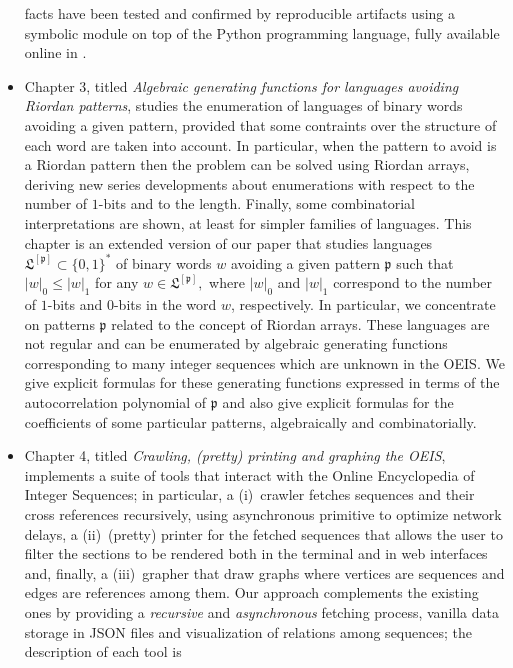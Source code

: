 \documentclass[a4paper, 10pt]{article}
\begin{document}
\begin{itemize}
facts have been tested and confirmed by reproducible artifacts using a symbolic
module on top of the Python programming language, fully available online in
\citep{MN:simulation:method:repo}.
\item Chapter 3, titled \textit{Algebraic generating functions for
languages avoiding Riordan patterns},
studies the enumeration of languages of binary words avoiding a given pattern,
provided that some contraints over the structure of each word are taken into
account.  In particular, when the pattern to avoid is a Riordan pattern then
the problem can be solved using Riordan arrays, deriving new series
developments about enumerations with respect to the number of $1$-bits and to
the length. Finally, some combinatorial interpretations are shown, at least for
simpler families of languages.  This chapter is an extended version of our paper
\citep{Merlini:Nocentini:algebraic:gf:avoiding:patterns} that studies languages
$\mathfrak{L}^{[\mathfrak{p}]}\subset \{0,1\}^*$ of binary words $w$ avoiding a
given pattern $\mathfrak{p}$ such that $|w|_0\leq |w|_1$ for any $w\in
\mathfrak{L}^{[\mathfrak{p}]},$ where  $|w|_0$ and $|w|_1$ correspond to the
number of $1$-bits  and $0$-bits in the word $w$, respectively.  In particular,
we concentrate on  patterns $\mathfrak{p}$ related to the concept of Riordan
arrays. These languages are not regular and can be enumerated by algebraic
generating functions corresponding to many integer sequences which are unknown
in the OEIS.  We give explicit formulas for these generating functions
expressed in terms of the autocorrelation polynomial of $\mathfrak{p}$ and also
give explicit formulas for the coefficients of some particular patterns,
algebraically and combinatorially.
\item Chapter 4, titled \textit{Crawling, (pretty) printing
and graphing the OEIS}, implements a suite of tools that interact with
the Online Encyclopedia of Integer Sequences; in particular, a (i)~crawler fetches
sequences and their cross references recursively, using asynchronous primitive
to optimize network delays, a (ii)~(pretty) printer for the fetched sequences that
allows the user to filter the sections to be rendered both in the terminal and in
web interfaces and, finally, a (iii)~grapher that draw graphs where vertices
are sequences and edges are references among them.
Our approach complements the existing ones by providing a \textit{recursive}
and \textit{asynchronous} fetching process, vanilla data storage in JSON files
and visualization of relations among sequences; the description of each tool is

\end{itemize}
\end{document}
